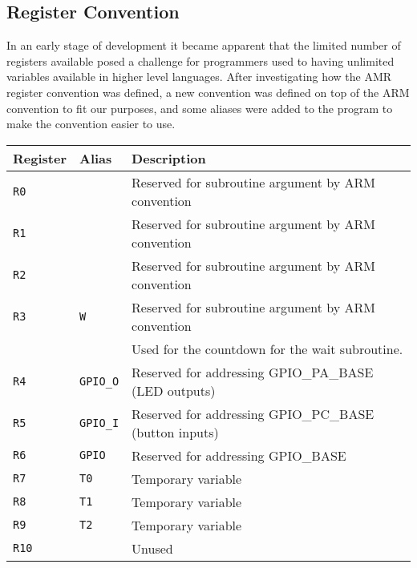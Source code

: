 \subsection{Register Convention}

In an early stage of development it became apparent that the limited number of registers available posed a challenge for programmers used to having unlimited variables available in higher level languages.
After investigating how the AMR register convention was defined, a new convention was defined on top of the ARM convention to fit our purposes, and some aliases were added to the program to make the convention easier to use.

\begin{table}[h!]
    \begin{tabular}{l | l | l}
        Register        & Alias             & Description                                            \\
        \hline
        \texttt{R0}     & ~                 & Reserved for subroutine argument by ARM convention     \\
        \texttt{R1}     & ~                 & Reserved for subroutine argument by ARM convention     \\
        \texttt{R2}     & ~                 & Reserved for subroutine argument by ARM convention     \\
        \texttt{R3}     & \texttt{W}        & Reserved for subroutine argument by ARM convention     \\
        ~               & ~                 & Used for the countdown for the wait subroutine.        \\
        \texttt{R4}     & \texttt{GPIO\_O}  & Reserved for addressing GPIO\_PA\_BASE (LED outputs)   \\
        \texttt{R5}     & \texttt{GPIO\_I}  & Reserved for addressing GPIO\_PC\_BASE (button inputs) \\
        \texttt{R6}     & \texttt{GPIO}     & Reserved for addressing GPIO\_BASE                     \\
        \texttt{R7}     & \texttt{T0}       & Temporary variable                                     \\
        \texttt{R8}     & \texttt{T1}       & Temporary variable                                     \\
        \texttt{R9}     & \texttt{T2}       & Temporary variable                                     \\
        \texttt{R10}    & ~                 & Unused                                                 \\

\end{tabular}
\end{table}

